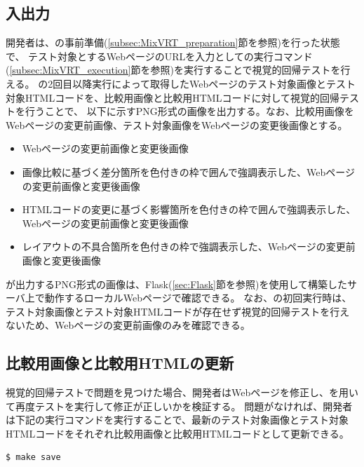\subsection{入出力}\label{subsec:MixVRT_IO}
開発者は、\toolName の事前準備(\ref{subsec:MixVRT_preparation}節を参照)を行った状態で、
テスト対象とするWebページのURLを入力として\toolName の実行コマンド(\ref{subsec:MixVRT_execution}節を参照)を実行することで視覚的回帰テストを行える。
\toolName の2回目以降実行によって取得したWebページのテスト対象画像とテスト対象HTMLコードを、比較用画像と比較用HTMLコードに対して視覚的回帰テストを行うことで、
以下に示すPNG形式の画像を出力する。なお、比較用画像をWebページの変更前画像、テスト対象画像をWebページの変更後画像とする。
\begin{itemize}
    \item Webページの変更前画像と変更後画像
    \item 画像比較に基づく差分箇所を色付きの枠で囲んで強調表示した、Webページの変更前画像と変更後画像
    \item HTMLコードの変更に基づく影響箇所を色付きの枠で囲んで強調表示した、Webページの変更前画像と変更後画像
    \item レイアウトの不具合箇所を色付きの枠で強調表示した、Webページの変更前画像と変更後画像
\end{itemize}
\toolName が出力するPNG形式の画像は、Flask(\ref{sec:Flask}節を参照)を使用して構築したサーバ上で動作するローカルWebページで確認できる。
なお、\toolName の初回実行時は、テスト対象画像とテスト対象HTMLコードが存在せず視覚的回帰テストを行えないため、Webページの変更前画像のみを確認できる。

\subsection{比較用画像と比較用HTMLの更新}\label{subsec:MixVRT_evaluate}
視覚的回帰テストで問題を見つけた場合、開発者はWebページを修正し、\toolName を用いて再度テストを実行して修正が正しいかを検証する。
問題がなければ、開発者は下記の実行コマンドを実行することで、最新のテスト対象画像とテスト対象HTMLコードをそれぞれ比較用画像と比較用HTMLコードとして更新できる。
\begin{lstlisting}[label=list:command,frame=none,numbers=none,basicstyle={\normalsize \ttfamily \color[gray]{.15}}]
    $ make save
\end{lstlisting}

